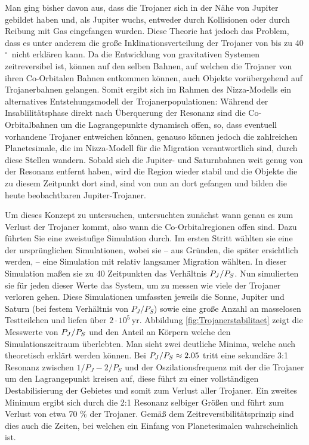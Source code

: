 \documentclass[12pt,a4paper,twoside]{article}
\newcommand{\degree}{$^\circ$}
\begin{document}
Man ging bisher davon aus, dass die Trojaner sich in der Nähe von Jupiter gebildet haben und, als Jupiter wuchs, entweder durch Kollisionen oder durch Reibung mit Gas %
eingefangen wurden.
Diese Theorie hat jedoch das Problem, dass es unter anderem die große Inklinationsverteilung der Trojaner von bis zu 40\degree\ nicht erklären kann\cite{Marzari2002,Morbidelli2005}. %
Da die Entwicklung von gravitativen Systemen zeitreversibel ist, %
können auf den selben Bahnen, auf welchen die Trojaner von ihren Co-Orbitalen Bahnen entkommen können, auch Objekte vorübergehend auf Trojanerbahnen gelangen.
Somit ergibt sich im Rahmen des Nizza-Modells ein alternatives Entstehungsmodell der Trojanerpopulationen: Während der Insablilitätsphase direkt nach Überquerung der Resonanz sind die Co-Orbitalbahnen um die Lagrangepunkte dynamisch offen, so, dass eventuell vorhandene Trojaner entweichen können, genauso können jedoch die zahlreichen Planetesimale, die im Nizza-Modell für die Migration verantwortlich sind, durch diese Stellen wandern. %
Sobald sich die Jupiter- und Saturnbahnen weit genug von der Resonanz entfernt haben, wird die Region wieder stabil und die Objekte die zu diesem Zeitpunkt dort sind, sind von nun an dort gefangen und bilden die heute beobachtbaren Jupiter-Trojaner.

Um dieses Konzept zu untersuchen, untersuchten \cite{Morbidelli2005} zunächst wann genau es zum Verlust der Trojaner kommt, also wann die Co-Orbitalregionen offen sind. %
Dazu führten Sie eine zweistufige Simulation durch. Im ersten Stritt wählten sie eine der ursprünglichen Simulationen, wobei sie – aus Gründen, die später ersichtlich werden, – eine Simulation mit relativ langsamer Migration wählten. %
In dieser Simulation maßen sie zu 40 Zeitpunkten das Verhältnis $P_J/P_S$.
Nun simulierten sie für jeden dieser Werte das System, um zu messen wie viele der Trojaner verloren gehen. Diese Simulationen umfassten jeweils die Sonne, Jupiter und Saturn (bei festem Verhältnis von $P_J/P_S$) sowie eine große Anzahl an masselosen Testteilchen und liefen über $2\cdot10^5 \, \mathrm{yr}$.
Abbildung \ref{fig:Trojanerstabilitaet} zeigt die Messwerte von $P_J/P_S$ und den Anteil an Körpern welche den Simulationszeitraum überlebten. Man sieht zwei deutliche Minima, welche auch theoretisch erklärt werden können.
Bei $P_J/P_S \approx 2.05$ tritt eine sekundäre 3:1 Resonanz zwischen $1/P_J-2/P_S$ und der Oszilationsfrequenz mit der die Trojaner um den Lagrangepunkt kreisen auf, diese führt zu einer vollständigen Destabilisierung der Gebietes und somit zum Verlust aller Trojaner.
Ein zweites Minimum ergibt sich durch die 2:1 Resonanz selbiger Größen und führt zum Verlust von etwa 70 \% der Trojaner.
Gemäß dem Zeitreversibilitätsprinzip sind dies auch die Zeiten, bei welchen ein Einfang von Planetesimalen wahrscheinlich ist.
\end{document}
